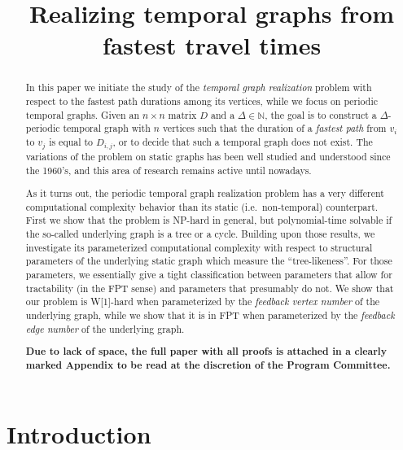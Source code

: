 \documentclass[a4paper,UKenglish,cleveref, autoref, thm-restate,anonymous]{lipics-v2021}
\title{Realizing temporal graphs from fastest travel times} %
\begin{document}
\maketitle

\begin{abstract}
In this paper we initiate the study of the \emph{temporal graph realization} problem with respect to the fastest path durations among its vertices, 
while we focus on periodic temporal graphs. 
Given an $n \times n$ matrix $D$ and a $\Delta \in \mathbb{N}$, the goal is to construct a $\Delta$-periodic temporal graph with $n$ vertices 
such that the duration of a \emph{fastest path} from $v_i$ to $v_j$ is equal to $D_{i,j}$, or to decide that such a temporal graph does not exist. 
The variations of the problem on static graphs has been well studied and understood since the 1960's, and this area of research remains active until nowadays. 

As it turns out, the periodic temporal graph realization problem has a very different computational complexity behavior than its static (i.e.~non-temporal) counterpart. 
First we show that the problem is NP-hard in general, but polynomial-time solvable if the so-called underlying graph is a tree or a cycle.
Building upon those results, we investigate its parameterized computational complexity with respect to structural parameters of the underlying static graph which measure the ``tree-likeness''. For those parameters, we essentially give a tight classification between parameters that allow for tractability (in the FPT sense) and parameters that presumably do not.
We show that our problem is W[1]-hard when parameterized by the \emph{feedback vertex number} of the underlying graph, while we show that it is in FPT when parameterized by the \emph{feedback edge number} of the underlying graph. 





\vspace{0,2cm}
\noindent \textbf{Due to lack of space, the full paper with all proofs is attached in a 
	clearly marked Appendix to be read at the discretion of the Program Committee.}
\end{abstract}


\section{Introduction}\label{intro-sec}
\end{document}
